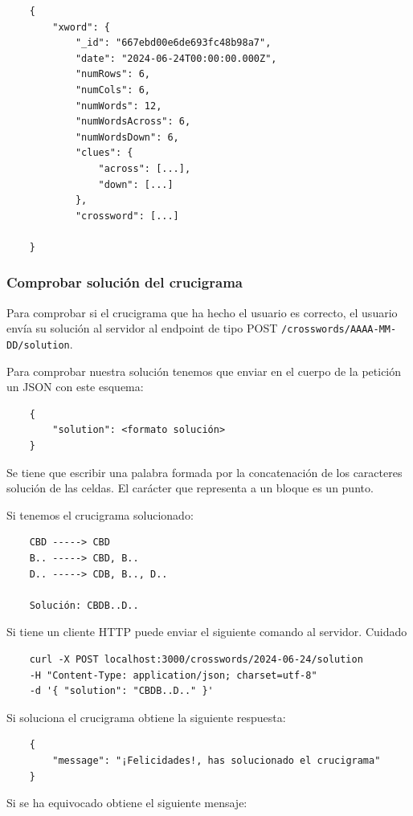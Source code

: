 \documentclass[12pt, a4paper]{article}
\begin{document}
\begin{verbatim}
	{
		"xword": {
			"_id": "667ebd00e6de693fc48b98a7",
			"date": "2024-06-24T00:00:00.000Z",
			"numRows": 6,
			"numCols": 6,
			"numWords": 12,
			"numWordsAcross": 6,
			"numWordsDown": 6,
			"clues": {
				"across": [...],
				"down": [...]
			},
			"crossword": [...]
		
	}
\end{verbatim}

\subsubsection{Comprobar solución del crucigrama}

Para comprobar si el crucigrama que ha hecho el usuario es correcto, el
usuario envía su solución al servidor al endpoint de tipo POST
\verb*|/crosswords/AAAA-MM-DD/solution|.

Para comprobar nuestra solución tenemos que enviar en el cuerpo
de la petición un JSON con este esquema:

\begin{verbatim}
	{
		"solution": <formato solución>
	}
\end{verbatim}

Se tiene que escribir una palabra formada por la concatenación
de los caracteres solución de las celdas.
El carácter que representa a un bloque es un punto.

Si tenemos el crucigrama solucionado:

\begin{verbatim}
	CBD -----> CBD
	B.. -----> CBD, B..
	D.. -----> CDB, B.., D..
	
	Solución: CBDB..D..
\end{verbatim}

Si tiene un cliente HTTP puede enviar el siguiente comando al servidor.
Cuidado 

\begin{verbatim}
	curl -X POST localhost:3000/crosswords/2024-06-24/solution
	-H "Content-Type: application/json; charset=utf-8"
	-d '{ "solution": "CBDB..D.." }'
\end{verbatim}

Si soluciona el crucigrama obtiene la siguiente respuesta:

\begin{verbatim}
	{
		"message": "¡Felicidades!, has solucionado el crucigrama"
	}
\end{verbatim}

Si se ha equivocado obtiene el siguiente mensaje:
\end{document}
